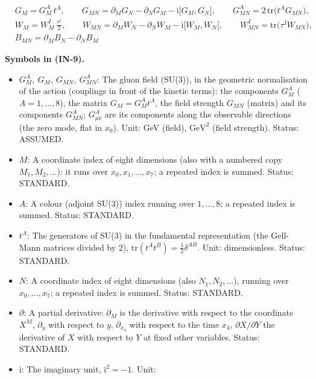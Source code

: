 \documentclass[
  10pt,
]{article}
\providecommand{\tightlist}{%
  \setlength{\itemsep}{0pt}\setlength{\parskip}{0pt}}
\begin{document}
\[
\begin{aligned}
&G_M = G^A_M\,t^A,\qquad G_{MN} = \partial_MG_N - \partial_NG_M - \mathrm{i}\big[G_M, G_N\big],\qquad
 G^A_{MN} = 2\,\mathrm{tr}\big(t^AG_{MN}\big),\\
&W_M = W^I_M\,\frac{\tau^I}{2},\qquad W_{MN} = \partial_MW_N - \partial_NW_M - \mathrm{i}\big[W_M,
 W_N\big],\qquad
 W^I_{MN} = \mathrm{tr}\big(\tau^IW_{MN}\big),\\
&B_{MN} = \partial_MB_N - \partial_NB_M
\end{aligned} \tag{IN-9}
\]

\textbf{Symbols in (IN-9).}

\begin{itemize}
\tightlist
\item
  \(G^A_M,\ G_M,\ G_{MN},\ G^A_{MN}\): The gluon field (SU(3)), in the
  geometric normalisation of the action (couplings in front of the
  kinetic terms): the components \(G^A_M\) (\(A = 1, \dots, 8\)), the
  matrix \(G_M = G^A_Mt^A\), the field strength \(G_{MN}\) (matrix) and
  its components \(G^A_{MN}\); \(G^A_{\mu\nu}\) are its components along
  the observable directions (the zero mode, flat in \(x_0\)). Unit: GeV
  (field), \(\mathrm{GeV}^{2}\) (field strength). Status: ASSUMED.
\item
  \(M\): A coordinate index of eight dimensions (also with a numbered
  copy \(M_1, M_2, \dots\)): it runs over \(x_0, x_1, \dots, x_7\); a
  repeated index is summed. Status: STANDARD.
\item
  \(A\): A colour (adjoint SU(3)) index running over \(1, \dots, 8\); a
  repeated index is summed. Status: STANDARD.
\item
  \(t^A\): The generators of SU(3) in the fundamental representation
  (the Gell-Mann matrices divided by 2),
  \(\mathrm{tr}(t^At^B) = \frac12\delta^{AB}\). Unit: dimensionless.
  Status: STANDARD.
\item
  \(N\): A coordinate index of eight dimensions (also
  \(N_1, N_2, \dots\)), running over \(x_0, \dots, x_7\); a repeated
  index is summed. Status: STANDARD.
\item
  \(\partial\): A partial derivative: \(\partial_M\) is the derivative
  with respect to the coordinate \(X^M\), \(\partial_y\) with respect to
  \(y\), \(\partial_{x_4}\) with respect to the time \(x_4\),
  \(\partial X/\partial Y\) the derivative of \(X\) with respect to
  \(Y\) at fixed other variables. Status: STANDARD.
\item
  \(\mathrm{i}\): The imaginary unit, \(\mathrm{i}^2 = -1\). Unit:

\end{itemize}
\end{document}
